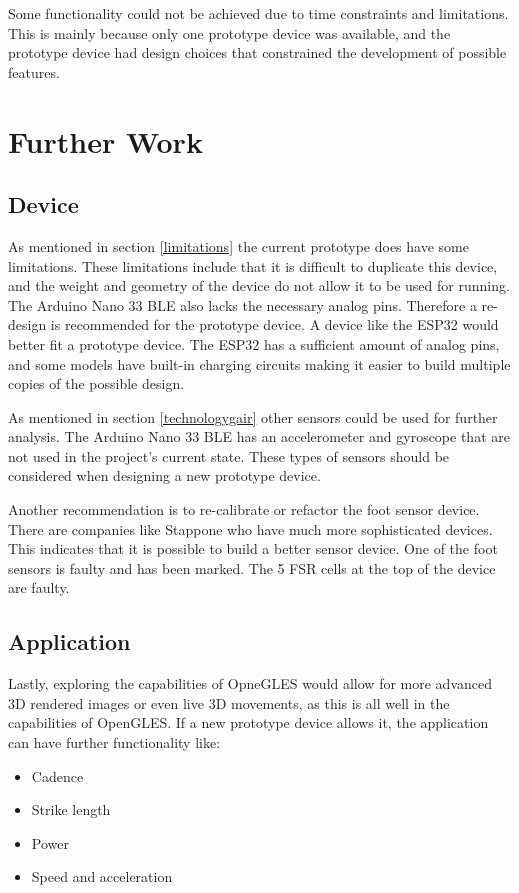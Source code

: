   Some functionality could not be achieved due to time constraints and limitations. This is mainly because only one prototype device was available, and the prototype device had design choices that constrained the development of possible features.


\clearpage
\chapter{Further Work}
\label{chap:furtherwork}

\section{Device}

As mentioned in section \ref{limitations} the current prototype does have some limitations. These limitations include that it is difficult to duplicate this device, and the weight and geometry of the device do not allow it to be used for running. The Arduino Nano 33 BLE also lacks the necessary analog pins. Therefore a re-design is recommended for the prototype device. A device like the ESP32 would better fit a prototype device. The ESP32 has a sufficient amount of analog pins, and some models have built-in charging circuits making it easier to build multiple copies of the possible design.

As mentioned in section \ref{technologygair} other sensors could be used for further analysis. The Arduino Nano 33 BLE has an accelerometer and gyroscope that are not used in the project's current state. These types of sensors should be considered when designing a new prototype device.

Another recommendation is to re-calibrate or refactor the foot sensor device. There are companies like Stappone\cite{stappone}  who have much more sophisticated devices. This indicates that it is possible to build a better sensor device. One of the foot sensors is faulty and has been marked. The 5 FSR cells at the top of the device are faulty.
\section{Application}

Lastly,  exploring the capabilities of OpneGLES would allow for more advanced 3D rendered images or even live 3D movements, as this is all well in the capabilities of OpenGLES.
If a new prototype device allows it, the application can have further functionality like:
\begin{itemize}
    \item Cadence
    \item Strike length
    \item Power
    \item Speed and acceleration 
  \end{itemize}
